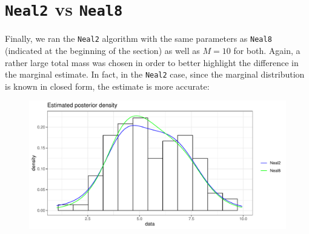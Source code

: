 \clearpage

\section{\texttt{Neal2} vs \texttt{Neal8}}
Finally, we ran the \verb|Neal2| algorithm with the same parameters as \verb|Neal8| (indicated at the beginning of the section) as well as $M=10$ for both.
Again, a rather large total mass was chosen in order to better highlight the difference in the marginal estimate.
In fact, in the \verb|Neal2| case, since the marginal distribution is known in closed form, the estimate is more accurate:
\begin{figure}[h]
	\centering
	\includegraphics[scale=0.7]{etc/neal2_M10.pdf}
\end{figure}

